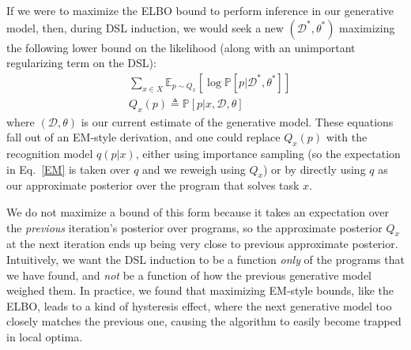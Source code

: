 \documentclass{article}
\newcommand{\expect}{\mathds{E}} %
\newcommand{\probability}{\mathds{P}} %
\begin{document}
If we were to maximize the ELBO bound to perform inference in
our generative model,
then, during DSL induction, we would seek a new $(\mathcal{D}^*,\theta^*)$ maximizing the following lower bound on the likelihood (along with an unimportant regularizing term on the DSL):
\begin{align}
  &  \sum_{x\in X}\expect_{p\sim Q_x}\left[\log \probability[p|\mathcal{D}^*,\theta^*] \right] \label{EM}\\
  & Q_x(p)\triangleq \probability[p|x,\mathcal{D},\theta]
\end{align}
where $(\mathcal{D},\theta)$ is our current estimate of the generative
model.  These equations fall out of an EM-style derivation, and one
could replace $Q_x(p)$ with the recognition model $q(p|x)$, either
using importance sampling (so the expectation in Eq.~\ref{EM} is taken
over $q$ and we reweigh using $Q_x$) or by directly using $q$ as our approximate posterior over the program that solves task $x$.

We do not maximize a bound of this form because it
takes an expectation over the \emph{previous} iteration's
posterior over programs,
so the approximate posterior $Q_x$ at the next iteration
ends up being very close to previous approximate posterior.
Intuitively,
we want the DSL induction to be a function \emph{only} of the programs that we have found,
and \emph{not} be a function of how the previous generative model weighed them.
In practice,
we found that maximizing EM-style bounds, like the ELBO,
leads to a kind of hysteresis effect,
where the next generative model too closely matches the previous one,
causing the algorithm to easily become trapped in local optima.
\end{document}
